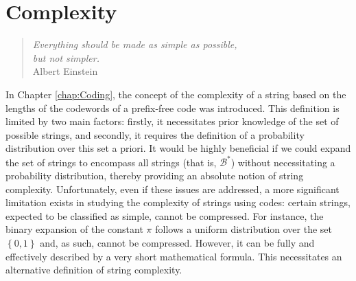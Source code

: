 %
%




\chapter{Complexity}
\label{chap:Algorithmic_Information}

\begin{quote}
\begin{flushright}
\emph{Everything should be made as simple as possible, \\
but not simpler. \\}
Albert Einstein
\end{flushright}
\end{quote}
\bigskip

In Chapter \ref{chap:Coding}, the concept of the complexity of a string based on the lengths of the codewords of a prefix-free code was introduced. This definition is limited by two main factors: firstly, it necessitates prior knowledge of the set of possible strings, and secondly, it requires the definition of a probability distribution over this set a priori. It would be highly beneficial if we could expand the set of strings to encompass all strings (that is, $\mathcal{B}^\ast$) without necessitating a probability distribution, thereby providing an absolute notion of string complexity. Unfortunately, even if these issues are addressed, a more significant limitation exists in studying the complexity of strings using codes: certain strings, expected to be classified as simple, cannot be compressed. For instance, the binary expansion of the constant $\pi$ follows a uniform distribution over the set $\left\{0, 1\right\}$ and, as such, cannot be compressed. However, it can be fully and effectively described by a very short mathematical formula. This necessitates an alternative definition of string complexity.


